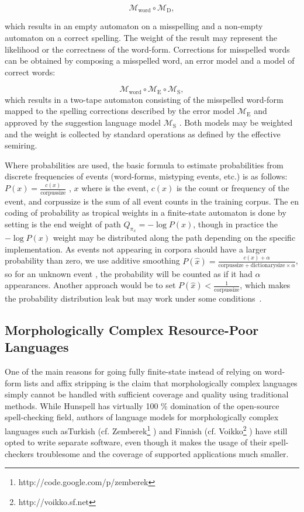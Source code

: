 \documentclass[postprint]{flammie}
\begin{document}
\begin{equation}
    \mathcal{M}_{\mathrm{word}} \circ \mathcal{M}_\mathrm{D},
\end{equation}


which results in an empty automaton on a misspelling and a non-empty automaton
on a correct spelling. The weight of the result may represent the likelihood or
the correctness of the word-form. Corrections for misspelled words can be
obtained by composing a misspelled word, an error model and a model of
correct words:

\begin{equation}
    \mathcal{M}_{\mathrm{word}} \circ \mathcal{M}_{\mathrm{E}} \circ \mathcal{M}_{\mathrm{S}},
\end{equation}
which results in a two-tape automaton consisting of the misspelled word-form
mapped to the spelling corrections described by the error model
 $\mathcal{M}_\mathrm{E}$ 
 and approved by the suggestion language model $\mathcal{M}_\mathrm{S}$
. Both models may be weighted and the weight is
collected by standard operations as defined by the effective semiring.

Where probabilities are used, the basic formula to estimate probabilities from
discrete frequencies of events (word-forms, mistyping events, etc.) is as
follows: $P(x) = \frac{c(x)}{\mathrm{corpus size}}$ , $x$ where is the event,
$c(x)$ is the count or frequency of the event, and $\mathrm{corpus size}$ is
the sum of all event counts in the training corpus. The en coding of
probability as tropical weights in a finite-state automaton is done by setting
is the end weight of path $Q_{\pi_x} = -\log P(x)$, though in practice the
$-\log P(x)$  weight may be distributed along the path depending on the
specific implementation.  As events not appearing in corpora should have a
larger probability than zero, we use additive smoothing $P(\hat x) = \frac{c(x)
+ \alpha}{\mathrm{corpus size} + \mathrm{dictionary size} \times \alpha}$, so
for an unknown event , the probability will be counted as if it had $\alpha$
appearances. Another approach would be to set $P(\hat x) <
\frac{1}{\mathrm{corpus size}}$, which makes the probability distribution leak
but may work under some conditions~\cite{brants2007large}.

\subsection{Morphologically Complex Resource-Poor Languages}

One of the main reasons for going fully finite-state instead of relying on
word-form lists and affix stripping is the claim that morphologically complex
languages simply cannot be handled with sufficient coverage and quality using
traditional methods.  While Hunspell has virtually 100 \% domination of the
open-source spell-checking field, authors of language models for
morphologically complex languages such asTurkish (cf.
Zemberek\footnote{http://code.google.com/p/zemberek} ) and Finnish (cf.
Voikko\footnote{http://voikko.sf.net} ) have still opted to write separate
software, even though it makes the usage of their spell-checkers troublesome
and the coverage of supported applications much smaller.
\end{document}
